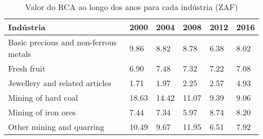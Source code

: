 \begin{table}
\centering
\caption{Valor do RCA ao longo dos anos para cada indústria (ZAF)}
\label{tab:ex3-tempo-ZAF}
\begin{tabular}{p{6cm}p{1.5cm}p{1.5cm}p{1.5cm}p{1.5cm}p{1.5cm}}
\toprule
                            Indústria &  2000 &  2004 &  2008 & 2012 & 2016 \\
\midrule
Basic precious and non-ferrous metals &  9.86 &  8.82 &  8.78 & 6.38 & 8.02 \\
                          Fresh fruit &  6.90 &  7.48 &  7.32 & 7.22 & 7.08 \\
       Jewellery and related articles &  1.71 &  1.97 &  2.25 & 2.57 & 4.93 \\
                  Mining of hard coal & 18.63 & 14.42 & 11.07 & 9.39 & 9.06 \\
                  Mining of iron ores &  7.44 &  7.34 &  5.97 & 8.74 & 8.20 \\
            Other mining and quarring & 10.49 &  9.67 & 11.95 & 6.51 & 7.92 \\
\bottomrule
\end{tabular}
\end{table}
